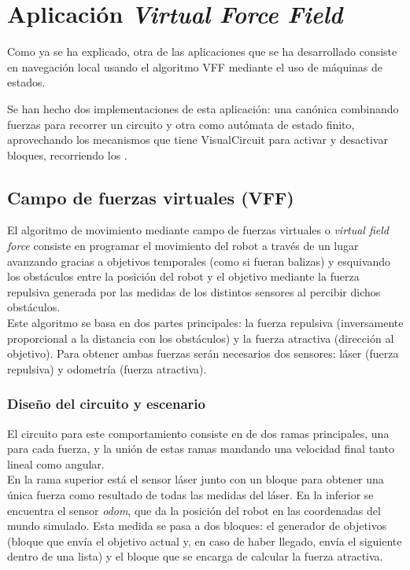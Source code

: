\chapter{Aplicación \textit{Virtual Force Field}}
\label{cap:capitulo6}
Como ya se ha explicado, otra de las aplicaciones que se ha desarrollado consiste en navegación local usando el algoritmo VFF
mediante el uso de máquinas de estados.

Se han hecho dos implementaciones de esta aplicación: una canónica combinando fuerzas para recorrer un circuito y otra
como autómata de estado finito, aprovechando los mecanismos que tiene VisualCircuit para activar y desactivar bloques, recorriendo los .

\section{Campo de fuerzas virtuales (VFF)}
\label{sec:VFF}

El algoritmo de movimiento mediante campo de fuerzas virtuales o \textit{virtual field force} consiste en programar el movimiento del robot a
través de un lugar avanzando gracias a objetivos temporales (como si fueran balizas) y esquivando los obstáculos entre la posición del robot
y el objetivo mediante la fuerza repulsiva generada por las medidas de los distintos sensores al percibir dichos obstáculos.\\

Este algoritmo se basa en dos partes principales: la fuerza repulsiva (inversamente proporcional a la distancia con los obstáculos) y la
fuerza atractiva (dirección al objetivo). Para obtener ambas fuerzas serán necesarios dos sensores: láser (fuerza repulsiva) y odometría (fuerza atractiva).\\

\subsection{Diseño del circuito y escenario}
\label{subsec:dis_bloques_VFF}

El circuito para este comportamiento consiste en de dos ramas principales, una para cada fuerza, y la unión de estas ramas mandando una velocidad
final tanto lineal como angular.\\

En la rama superior está el sensor láser junto con un bloque para obtener una única fuerza como resultado de todas las medidas del láser. En la inferior
se encuentra el sensor \textit{odom}, que da la posición del robot en las coordenadas del mundo simulado.
Esta medida se pasa a dos bloques: el generador de objetivos (bloque que envía el objetivo actual y, en caso de haber llegado, envía el siguiente dentro
de una lista) y el bloque que se encarga de calcular la fuerza atractiva.

